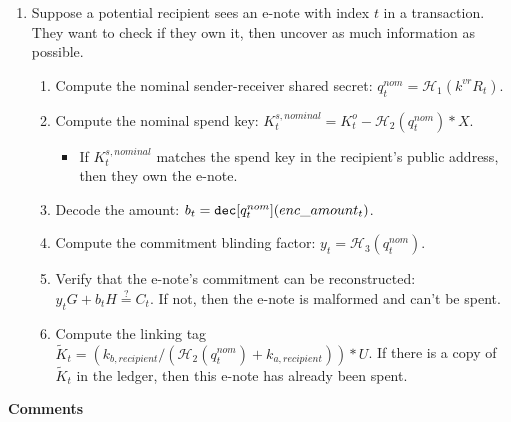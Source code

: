 \begin{enumerate}
    \item Suppose a potential recipient sees an e-note with index $t$ in a transaction. They want to check if they own it, then uncover as much information as possible.
    \begin{enumerate}
        \item Compute the nominal sender-receiver shared secret: $q^{nom}_t = \mathcal{H}_1(k^{vr} R_t)$.
        \item Compute the nominal spend key: $K^{s,nominal}_t = K^o_t - \mathcal{H}_2(q^{nom}_t)*X$.
        \begin{itemize}
            \item If $K^{s,nominal}_t$ matches the spend key in the recipient's public address, then they own the e-note.
        \end{itemize}
        \item Decode the amount: $b_t = \textrm{\tt dec}[q^{nom}_t](enc\_amount_t)$.
        \item Compute the commitment blinding factor: $y_t = \mathcal{H}_3(q^{nom}_t)$.
        \item Verify that the e-note's commitment can be reconstructed: $y_t G + b_t H \stackrel{?}{=} C_t$. If not, then the e-note is malformed and can't be spent.
        \item Compute the linking tag $\tilde{K}_t = (k_{b,recipient}/(\mathcal{H}_2(q^{nom}_t) + k_{a,recipient}))*U$. If there is a copy of $\tilde{K}_t$ in the ledger, then this e-note has already been spent.
    \end{enumerate}
\end{enumerate}

\textbf{Comments}

